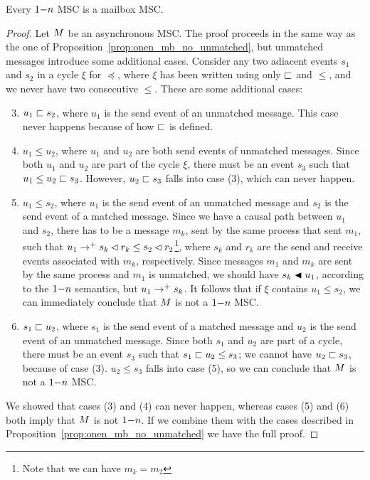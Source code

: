 \documentclass{article}
\begin{document}
\begin{proposition}\label{prop:onen_mb_unmatched}
	Every $1\mathsf{-}n$ MSC is a mailbox MSC.
\end{proposition}
\begin{proof}
Let $M$ be an asynchronous MSC. The proof proceeds in the same way as the one of Proposition~\ref{prop:onen_mb_no_unmatched}, but unmatched messages introduce some additional cases. Consider any two adiacent events $s_1$ and $s_2$ in a cycle $\xi$ for $\preceq$, where $\xi$ has been written using only $\sqsubset$ and $\le$, and we never have two consecutive $\le$. These are some additional cases:
\begin{enumerate}\setcounter{enumi}{2}
	\item $u_1 \sqsubset s_2$, where $u_1$ is the send event of an unmatched message. This case never happens because of how $\sqsubset$ is defined.
	\item $u_1 \le u_2$, where $u_1$ and $u_2$ are both send events of unmatched messages. Since both $u_1$ and $u_2$ are part of the cycle $\xi$, there must be an event $s_3$ such that $u_1 \le u_2 \sqsubset s_3$. However, $u_2 \sqsubset s_3$ falls into case (3), which can never happen.
	\item $u_1 \le s_2$, where $u_1$ is the send event of an unmatched message and $s_2$ is the send event of a matched message. Since we have a causal path between $u_1$ and $s_2$, there has to be a message $m_k$, sent by the same process that sent $m_1$, such that $u_1 \to^+ s_k \lhd r_k \le s_2 \lhd r_2$\footnote{Note that we can have $m_k = m_2$}, where $s_k$ and $r_k$ are the send and receive events associated with $m_k$, respectively. Since messages $m_1$ and $m_k$ are sent by the same process and $m_1$ is unmatched, we should have $s_k \blacktriangleleft u_1$, according to the $1\mathsf{-}n$ semantics, but $u_1 \to^+ s_k$. It follows that if $\xi$ contains $u_1 \le s_2$, we can immediately conclude that $M$ is not a $1\mathsf{-}n$ MSC.
	\item $s_1 \sqsubset u_2$,  where $s_1$ is the send event of a matched message and $u_2$ is the send event of an unmatched message. Since both $s_1$ and $u_2$ are part of a cycle, there must be an event $s_3$ such that $s_1 \sqsubset u_2 \le s_3$; we cannot have $u_2 \sqsubset s_3$, because of case (3). $u_2 \le s_3$ falls into case (5), so we can conclude that $M$ is not a $1\mathsf{-}n$ MSC.
\end{enumerate}
We showed that cases (3) and (4) can never happen, whereas cases (5) and (6) both imply that $M$ is not $1\mathsf{-}n$. If we combine them with the cases described in Proposition~\ref{prop:onen_mb_no_unmatched} we have the full proof.
\end{proof}
\end{document}
